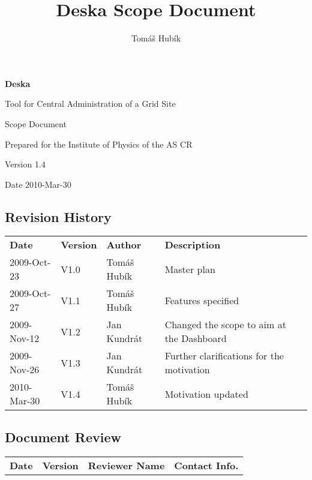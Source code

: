 \documentclass[12pt]{article}
\author{Tomáš Hubík}
\title{Deska Scope Document}
\begin{document}
{\Huge \textbf{Deska}}

\vspace{0.2in}

{\large Tool for Central Administration of a Grid Site}

\vspace{0.5in}

{\large Scope Document}

\vspace{0.2in}

{\large Prepared for the Institute of Physics of the AS CR}

\vspace{0.2in}

{\large Version 1.4}

\vspace{0.2in}

{\large Date 2010-Mar-30}

\vspace{0.5in}

\subsection*{Revision History}

\begin{table}[!h]
	\begin{tabular}{l l l l}
		\textbf{Date} & \textbf{Version} & \textbf{Author} & \textbf{Description} \\
		2009-Oct-23 & V1.0 & Tomáš Hubík & Master plan \\
		2009-Oct-27 & V1.1 & Tomáš Hubík & Features specified \\
		2009-Nov-12 & V1.2 & Jan Kundrát & Changed the scope to aim at the
        																Dashboard \\
		2009-Nov-26 & V1.3 & Jan Kundrát & Further clarifications for the
																				motivation\\
		2010-Mar-30 & V1.4 & Tomáš Hubík & Motivation updated \\      
	\end{tabular}
	\label{tab:RevisionHistory}
\end{table}


\subsection*{Document Review}

\begin{table}[!h]
	\begin{tabular}{l l l l}
		\textbf{Date} & \textbf{Version} & \textbf{Reviewer Name} & \textbf{Contact Info.} \\
	\end{tabular}
	\label{tab:DocumentReview}
\end{table}
\end{document}
